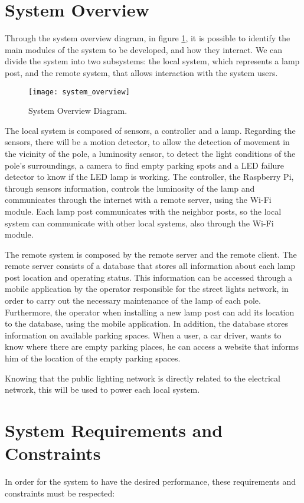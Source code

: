\section{System Overview}
Through the system overview diagram, in figure \ref{fig:system_overview}, it is possible to identify the main modules of the system to be developed, and how they interact. We can divide the system into two subsystems: the local system, which represents a lamp post, and the remote system, that allows interaction with the system users.

\begin{figure}[ht]
	\centering
	\texttt{[image: system\_overview]}
	\caption{System Overview Diagram.}
	\label{fig:system_overview}
\end{figure}

The local system is composed of sensors, a controller and a lamp. Regarding the sensors, there will be a motion detector, to allow the detection of movement in the vicinity of the pole, a luminosity sensor, to detect the light conditions of the pole’s surroundings, a camera to find empty parking spots and a LED failure detector to know if the LED lamp is working. The controller, the Raspberry Pi, through sensors information, controls the luminosity of the lamp and communicates through the internet with a remote server, using the Wi-Fi module. Each lamp post communicates with the neighbor posts, so the local system can communicate with other local systems, also through the Wi-Fi module.

The remote system is composed by the remote server and the remote client. The remote server consists of a database that stores all information about each lamp post location and operating status. This information can be accessed through a mobile application by the operator  responsible for the street lights network, in order to carry out the necessary maintenance of the lamp of each pole. Furthermore, the operator when installing a new lamp post can add its location to the database, using the mobile application. In addition, the database stores information on available parking spaces. When a user, a car driver, wants to know where there are empty parking places, he can access a website that informs him of the location of the empty parking spaces.

Knowing that the public lighting network is directly related to the electrical network, this will be used to power each local system.

\section{System Requirements and Constraints}
In order for the system to have the desired performance, these requirements and constraints must be respected:

